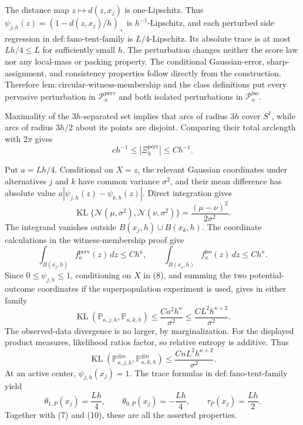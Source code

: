 The distance map \(z\mapsto d(z,x_j)\) is one-Lipschitz. Thus \(\psi_{j,h}(z)=(1-d(z,x_j)/h)_+\) is \(h^{-1}\)-Lipschitz, and each perturbed side regression in \(\mathrm{def:fano\text{-}tent\text{-}family}\) is \(L/4\)-Lipschitz. Its absolute trace is at most \(Lh/4\le L\) for sufficiently small \(h\). The perturbation changes neither the score law nor any local-mass or packing property. The conditional Gaussian-error, sharp-assignment, and consistency properties follow directly from the construction. Therefore \(\mathrm{lem:circular\text{-}witness\text{-}membership}\) and the class definitions put every pervasive perturbation in \(\mathcal P_{\kappa}^{\mathrm{perv}}\) and both isolated perturbations in \(\mathcal P_{\kappa}^{\mathrm{iso}}\).

Maximality of the \(3h\)-separated set implies that arcs of radius \(3h\) cover \(S^1\), while arcs of radius \(3h/2\) about its points are disjoint. Comparing their total arclength with \(2\pi\) gives
\[
 c h^{-1}\le |\Xi_h^{\mathrm{perv}}|\le C h^{-1}. \tag{7}
\]

Put \(a=Lh/4\). Conditional on \(X=z\), the relevant Gaussian coordinates under alternatives \(j\) and \(k\) have common variance \(\sigma^2\), and their mean difference has absolute value \(a|\psi_{j,h}(z)-\psi_{k,h}(z)|\). Direct integration gives
\[
 \operatorname{KL}\{\mathcal N(\mu,\sigma^2),\mathcal N(\nu,\sigma^2)\}
 =\frac{(\mu-\nu)^2}{2\sigma^2}. \tag{8}
\]
The integrand vanishes outside \(B(x_j,h)\cup B(x_k,h)\). The coordinate calculations in the witness-membership proof give
\[
 \int_{B(x_j,h)}f_{\kappa}^{\mathrm{perv}}(z)\,dz\le Ch^{\kappa},
 \qquad
 \int_{B(x_{\star},h)}f_{\kappa}^{\mathrm{iso}}(z)\,dz\le Ch^{\kappa}.
\]
Since \(0\le\psi_{j,h}\le1\), conditioning on \(X\) in (8), and summing the two potential-outcome coordinates if the superpopulation experiment is used, gives in either family
\[
 \operatorname{KL}(\mathbb P_{\kappa,j,h},\mathbb P_{\kappa,k,h})
 \le \frac{Ca^2h^{\kappa}}{\sigma^2}
 \le \frac{CL^2h^{\kappa+2}}{\sigma^2}. \tag{9}
\]
The observed-data divergence is no larger, by marginalization. For the displayed product measures, likelihood ratios factor, so relative entropy is additive. Thus
\[
 \operatorname{KL}(\mathbb P_{\kappa,j,h}^{\otimes n},
 \mathbb P_{\kappa,k,h}^{\otimes n})
 \le \frac{CnL^2h^{\kappa+2}}{\sigma^2}. \tag{10}
\]
At an active center, \(\psi_{j,h}(x_j)=1\). The trace formulas in \(\mathrm{def:fano\text{-}tent\text{-}family}\) yield
\[
 \theta_{1,P}(x_j)=\frac{Lh}{4},\qquad
 \theta_{0,P}(x_j)=-\frac{Lh}{4},\qquad
 \tau_P(x_j)=\frac{Lh}{2}.
\]
Together with (7) and (10), these are all the asserted properties.